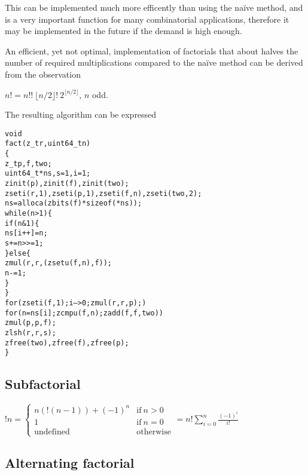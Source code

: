 This can be implemented much more efficently
than using the naïve method, and is a very
important function for many combinatorial
applications, therefore it may be implemented
in the future if the demand is high enough.

An efficient, yet not optimal, implementation
of factorials that about halves the number of
required multiplications compared to the naïve
method can be derived from the observation

\vspace{1em}
\( \displaystyle{
    n! = n!! ~ \lfloor n / 2 \rfloor! ~ 2^{\lfloor n / 2 \rfloor}
}\), $n$ odd.
\vspace{1em}

\noindent
The resulting algorithm can be expressed

\begin{alltt}
   void
   fact(z_t r, uint64_t n)
   \{
       z_t p, f, two;
       uint64_t *ns, s = 1, i = 1;
       zinit(p), zinit(f), zinit(two);
       zseti(r, 1), zseti(p, 1), zseti(f, n), zseti(two, 2);
       ns = alloca(zbits(f) * sizeof(*ns));
       while (n > 1) \{
           if (n & 1) \{
               ns[i++] = n;
               s += n >>= 1;
           \} else \{
               zmul(r, r, (zsetu(f, n), f));
               n -= 1;
           \}
       \}
       for (zseti(f, 1); i-- > 0; zmul(r, r, p);)
           for (n = ns[i]; zcmpu(f, n); zadd(f, f, two))
               zmul(p, p, f);
       zlsh(r, r, s);
       zfree(two), zfree(f), zfree(p);
   \}
\end{alltt}


\subsection{Subfactorial}
\label{sec:Subfactorial}

\( \displaystyle{
    !n = \left \lbrace \begin{array}{ll}
      n(!(n - 1)) + (-1)^n & \textrm{if}~ n > 0 \\
      1 & \textrm{if}~ n = 0 \\
      \textrm{undefined} & \textrm{otherwise}
    \end{array} \right . =
    n! \sum_{i = 0}^n \frac{(-1)^i}{i!}
}\)


\subsection{Alternating factorial}
\label{sec:Alternating factorial}


